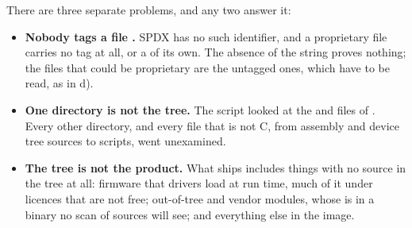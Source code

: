  There are three separate problems, and any two answer it:
\begin{itemize}
  \item \textbf{Nobody tags a file .} SPDX has no such identifier, and a
    proprietary file carries no tag at all, or a  of its own. The absence of the
    string proves nothing; the files that could be proprietary are the untagged ones, which have to
    be read, as in d).
  \item \textbf{One directory is not the tree.} The script looked at the  and 
    files of . Every other directory, and every file that is not C, from assembly
    and device tree sources to scripts, went unexamined.
  \item \textbf{The tree is not the product.} What ships includes things with no source in the tree
    at all: firmware that drivers load at run time, much of it under licences that are not free;
    out-of-tree and vendor modules, whose  is in a binary no scan of sources
    will see; and everything else in the image.
\end{itemize}
